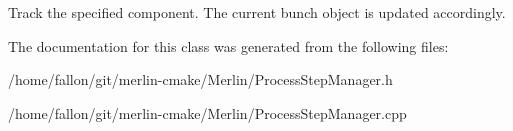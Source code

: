 Track the specified component. The current bunch object is updated accordingly. 

The documentation for this class was generated from the following files\+:\begin{DoxyCompactItemize}
\item 
/home/fallon/git/merlin-\/cmake/\+Merlin/Process\+Step\+Manager.\+h\item 
/home/fallon/git/merlin-\/cmake/\+Merlin/Process\+Step\+Manager.\+cpp\end{DoxyCompactItemize}
